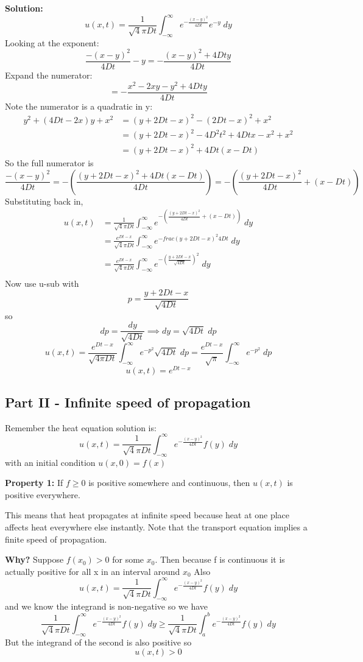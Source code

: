 \documentclass[12pt]{article}
\begin{document}
\textbf{Solution:}
\[u(x, t) = \frac{1}{\sqrt4\pi D t} \int_{-\infty}^\infty e^{-\frac{(x - y)^2}{4Dt}} e^{-y} \; dy\]
Looking at the exponent:
\[\frac{-(x-y)^2}{4Dt} - y = -\frac{(x-y)^2 + 4Dty}{4Dt}\]
Expand the numerator:
\[ = -\frac{x^2 - 2xy - y^2 + 4Dty}{4Dt}\]
Note the numerator is a quadratic in y:
\begin{align*}
    y^2 + (4Dt - 2x)y + x^2 &= (y + 2Dt - x)^2 - (2Dt - x)^2 + x^2\\
    &= (y + 2Dt - x)^2 - 4D^2t^2 + 4Dtx - x^2 + x^2\\
    &= (y + 2Dt - x)^2 + 4Dt(x - Dt)
\end{align*}
So the full numerator is 
\[\frac{-(x-y)^2}{4Dt} = -\left(\frac{(y + 2Dt - x)^2 + 4Dt(x - Dt)}{4Dt}\right) = -\left(\frac{(y+2Dt-x)^2}{4Dt}+ (x - Dt)\right)\]
Substituting back in, 
\begin{align*}
    u(x, t) &= \frac{1}{\sqrt4\pi D t} \int_{-\infty}^\infty e^{-\left(\frac{(y+2Dt-x)^2}{4Dt}+ (x - Dt)\right)} \; dy\\
    &= \frac{e^{Dt - x}}{\sqrt4\pi D t}\int_{-\infty}^\infty e^{-frac{(y+2Dt-x)^2}{4Dt}} \; dy\\
    &= \frac{e^{Dt - x}}{\sqrt4\pi D t}\int_{-\infty}^\infty e^{-\left(\frac{y+2Dt-x}{\sqrt{4Dt}}\right)^2} \; dy\\
\end{align*}
Now use u-sub with 
\[p = \frac{y+2Dt-x}{\sqrt{4Dt}}\]
so 
\[dp = \frac{dy}{\sqrt{4Dt}} \implies dy = \sqrt{4Dt} \; dp\]
\[u(x, t) = \frac{e^{Dt - x}}{\sqrt{4\pi D t}}\int_{-\infty}^\infty e^{-p^2} \sqrt{4Dt}\; dp = \frac{e^{Dt - x}}{\sqrt{\pi}} \int_{-\infty}^\infty e^{-p^2}\; dp\]
\[\boxed{u(x, t) = e^{Dt- x}}\]

\subsection*{Part II - Infinite speed of propagation}
Remember the heat equation solution is:
\[u(x, t) = \frac{1}{\sqrt4\pi D t} \int_{-\infty}^\infty e^{-\frac{(x - y)^2}{4Dt}} f(y) \; dy\]
with an initial condition $u(x, 0) = f(x)$

\textbf{Property 1:} If $f \geq 0$ is positive somewhere and continuous, then $u(x, t)$ is positive everywhere. 

This means that heat propagates at infinite speed because heat at one place affects heat everywhere else instantly. Note that the transport equation implies a finite speed of propagation.

\textbf{Why?} 
Suppose $f(x_0) > 0$ for some $x_0$. Then because f is continuous it is actually positive for all x in an interval around $x_0$
Also 
\[u(x, t) = \frac{1}{\sqrt4\pi D t} \int_{-\infty}^\infty e^{-\frac{(x - y)^2}{4Dt}} f(y) \; dy\]
and we know the integrand is non-negative so we have 
\[\frac{1}{\sqrt4\pi D t} \int_{-\infty}^\infty e^{-\frac{(x - y)^2}{4Dt}} f(y) \; dy \geq \frac{1}{\sqrt4\pi D t} \int_{a}^b e^{-\frac{(x - y)^2}{4Dt}} f(y) \; dy\]
But the integrand of the second is also positive so 
\[u(x, t) > 0\] 
\end{document}
